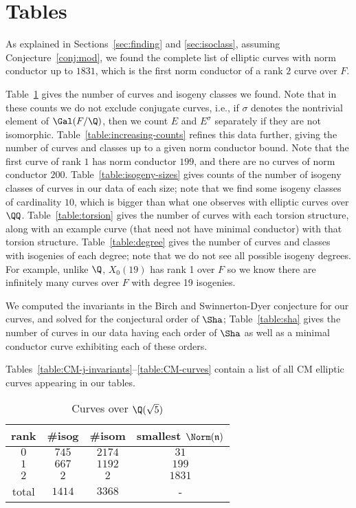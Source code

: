 \documentclass{amsart}
\newcommand{\n}{\mathfrak{n}}
\begin{document}
\section{Tables}\label{sec:tables}

As explained in Sections~\ref{sec:finding} and \ref{sec:isoclass},
assuming Conjecture~\ref{conj:mod}, we found the complete list of
elliptic curves with norm conductor up to $1831$, which is the first
norm conductor of a rank $2$ curve over $F$.

Table~\ref{table:total-counts} gives the number of curves and isogeny
classes we found. Note that in these counts we do not exclude
conjugate curves, i.e., if $\sigma$ denotes the nontrivial element of
$\Gal(F/\Q)$, then we count $E$ and $E^{\sigma}$ separately if they
are not isomorphic. Table~\ref{table:increasing-counts} refines this
data further, giving the number of curves and classes up to a given
norm conductor bound. Note that the first curve of rank $1$ has
norm conductor $199$, and there are no curves of norm conductor $200$.
Table~\ref{table:isogeny-sizes} gives counts of the number of isogeny
classes of curves in our data of each size; note that we find some
isogeny classes of cardinality $10$, which is bigger than what one
observes with elliptic curves over $\QQ$.
Table~\ref{table:torsion} gives the number of curves with each
torsion structure, along with an example curve (that need not have
minimal conductor) with that torsion structure.
Table~\ref{table:degree} gives the number of curves and classes with
isogenies of each degree; note that we do not see all possible isogeny
degrees. For example, unlike $\Q$, $X_0(19)$ has rank 1 over $F$ so we
know there are infinitely many curves over $F$ with degree 19 isogenies.

We computed the invariants in the Birch and Swinnerton-Dyer conjecture
for our curves, and solved for the conjectural order of $\Sha$;
Table~\ref{table:sha} gives the number of curves in our data
having each order of $\Sha$ as well as a minimal conductor curve
exhibiting each of these orders. 

Tables~\ref{table:CM-j-invariants}--\ref{table:CM-curves} contain
a list of all CM elliptic curves appearing in our tables. 



\begin{center}
\begin{table}[h]
\caption{Curves over $\Q(\sqrt{5})$\label{table:total-counts}}
\begin{tabular}{|c|c|c|c|}\hline
\textbf{rank} & \textbf{\#isog} & \textbf{\#isom} & \textbf{smallest $\Norm(\n)$} \\\hline
 $0$  & $745$  & $2174$ & $31$\\\hline
 $1$  & $667$  & $1192$ & $199$ \\\hline
 $2$  & $2$    & $2$    & $1831$ \\\hline
total & $1414$ & $3368$ & - \\\hline
\end{tabular}
\end{table}
\end{center}
\end{document}
